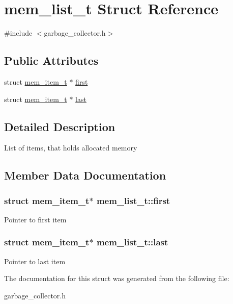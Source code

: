 \hypertarget{structmem__list__t}{}\section{mem\+\_\+list\+\_\+t Struct Reference}
\label{structmem__list__t}


{\ttfamily \#include $<$garbage\+\_\+collector.\+h$>$}

\subsection*{Public Attributes}
\begin{DoxyCompactItemize}
\item 
struct \hyperlink{structmem__item__t}{mem\+\_\+item\+\_\+t} $\ast$ \hyperlink{structmem__list__t_a660f5ef09ad8cd1d5dcd84a12600b8de}{first}
\item 
struct \hyperlink{structmem__item__t}{mem\+\_\+item\+\_\+t} $\ast$ \hyperlink{structmem__list__t_ad0d6a4567a65701564f45cb8161f675a}{last}
\end{DoxyCompactItemize}


\subsection{Detailed Description}
List of items, that holds allocated memory 

\subsection{Member Data Documentation}
\hypertarget{structmem__list__t_a660f5ef09ad8cd1d5dcd84a12600b8de}{}
\subsubsection[{first}]{\setlength{\rightskip}{0pt plus 5cm}struct {\bf mem\+\_\+item\+\_\+t}$\ast$ mem\+\_\+list\+\_\+t\+::first}\label{structmem__list__t_a660f5ef09ad8cd1d5dcd84a12600b8de}
Pointer to first item \hypertarget{structmem__list__t_ad0d6a4567a65701564f45cb8161f675a}{}
\subsubsection[{last}]{\setlength{\rightskip}{0pt plus 5cm}struct {\bf mem\+\_\+item\+\_\+t}$\ast$ mem\+\_\+list\+\_\+t\+::last}\label{structmem__list__t_ad0d6a4567a65701564f45cb8161f675a}
Pointer to last item 

The documentation for this struct was generated from the following file\+:\begin{DoxyCompactItemize}
\item 
garbage\+\_\+collector.\+h\end{DoxyCompactItemize}
